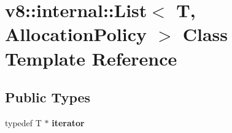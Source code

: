 \hypertarget{classv8_1_1internal_1_1_list}{}\section{v8\+:\+:internal\+:\+:List$<$ T, Allocation\+Policy $>$ Class Template Reference}
\label{classv8_1_1internal_1_1_list}
\subsection*{Public Types}
\begin{DoxyCompactItemize}
\item 
typedef T $\ast$ {\bfseries iterator}\hypertarget{classv8_1_1internal_1_1_list_a63875655519e6be0b2945aeddd1dc2be}{}\label{classv8_1_1internal_1_1_list_a63875655519e6be0b2945aeddd1dc2be}

\end{DoxyCompactItemize}
